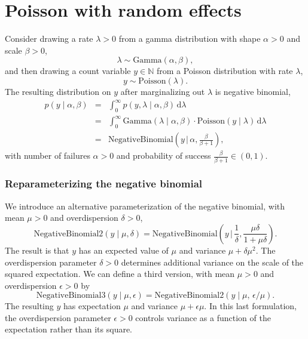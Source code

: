 \documentclass[11pt]{report}
\begin{document}
\section{Poisson with random effects}

Consider drawing a rate $\lambda > 0$ from a gamma distribution with
shape $\alpha > 0$ and scale $\beta > 0$,
%
\[
  \lambda \sim \textrm{Gamma}(\alpha, \beta),
\]
%
and then drawing a count variable $y \in \mathbb{N}$ from a Poisson
distribution with rate $\lambda$,
%
\[
  y \sim \textrm{Poisson}(\lambda).
\]
%
The resulting distribution on $y$ after marginalizing out $\lambda$ is
negative binomial,
%
\begin{eqnarray*}
  p(y \mid \alpha, \beta)
  & = & \int_0^{\infty} p(y, \lambda \mid \alpha, \beta) \, \textrm{d}\lambda
  \\[3pt]
  & = & \int_0^{\infty} \textrm{Gamma}(\lambda \mid \alpha, \beta)
        \cdot \textrm{Poisson}(y \mid \lambda) \, \textrm{d}\lambda
  \\[3pt]
  & = &  \textrm{NegativeBinomial}\left(y \,\bigg|\,
        \alpha, \frac{\beta}{\beta + 1} \right),
\end{eqnarray*}
%
with number of failures $\alpha > 0$ and probability of success
$\frac{\beta}{\beta + 1} \in (0, 1)$.


\subsubsection{Reparameterizing the negative binomial}

We introduce an alternative parameterization of the negative binomial,
with mean $\mu > 0$ and overdispersion $\delta > 0$,
%
\[
  \textrm{NegativeBinomial2}(y \mid \mu, \delta)
  =
  \textrm{NegativeBinomial}\left(y \,\big|\, \frac{1}{\delta}, \frac{\mu \delta}{1 + \mu \delta}\right).
\]
%
The result is that $y$ has an expected value of $\mu$ and variance $\mu + \delta \mu^2$.
The overdispersion parameter $\delta > 0$ determines additional
variance on the scale of the squared expectation.  We can define a
third version, with mean $\mu > 0$ and overdispersion $\epsilon > 0$
by
%
\[
  \textrm{NegativeBinomial3}(y \mid \mu, \epsilon)
  =
  \textrm{NegativeBinomial2}(y \mid \mu, \, \epsilon / \mu).
\]
%
The resulting $y$ has expectation $\mu$ and variance $\mu + \epsilon
\mu$.  In this last formulation, the overdispersion parameter
$\epsilon > 0$ controls variance as a function of the expectation
rather than its square.
\end{document}
